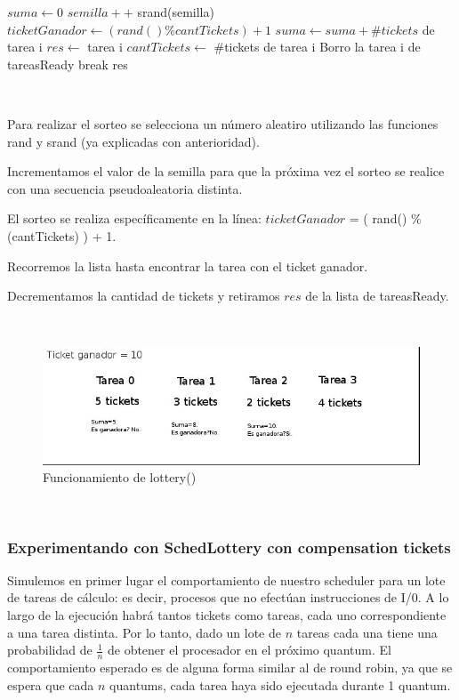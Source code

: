 \begin{algorithmic}
	\State $suma \gets 0$
      	\State $semilla++$
	\State srand(semilla)
	\State $ticketGanador \gets (rand() \% cantTickets)+1$
		\State $suma \gets suma+ \#tickets$ de tarea i		
			\State $res \gets$ tarea i
			\State $cantTickets \gets $ \#tickets de tarea i	
			\State Borro la tarea i de tareasReady
			\State break
		\EndIf
	\EndFor	
	\State \Return res
  \EndFunction
\end{algorithmic}

~

Para realizar el sorteo se selecciona un número aleatiro utilizando las funciones rand y srand (ya explicadas con anterioridad).

Incrementamos el valor de la semilla para que la próxima vez el sorteo se realice con una secuencia pseudoaleatoria distinta.

El sorteo se realiza específicamente en la línea: $ticketGanador$ = ( rand() \% (cantTickets) ) + 1.

Recorremos la lista hasta encontrar la tarea con el ticket ganador.

Decrementamos la cantidad de tickets y retiramos $res$ de la lista de tareasReady.

~

\begin{figure}[H]
  \centering\includegraphics[scale=0.5]{graficos/lottery.jpg}
  \caption{Funcionamiento de lottery()}
\end{figure}

~

\subsubsection{Experimentando con SchedLottery con compensation tickets}

Simulemos en primer lugar el comportamiento de nuestro scheduler para un lote de tareas de cálculo: es decir, procesos que no 
efectúan instrucciones de I/0. A lo largo de la ejecución habrá tantos tickets como tareas, cada uno correspondiente a una
tarea distinta. Por lo tanto, dado un lote de $n$ tareas cada una tiene una probabilidad de $\frac{1}{n}$ de obtener el procesador
en el próximo quantum. El comportamiento esperado es de alguna forma similar al de round robin, ya que se espera que cada $n$
quantums, cada tarea haya sido ejecutada durante 1 quantum.


